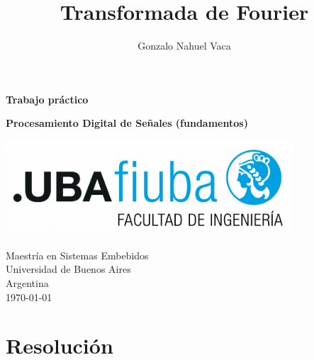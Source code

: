 \documentclass[
    11pt,
    spanish,
	a4paper
]{article}
\title{Transformada de Fourier}
\author{Gonzalo Nahuel Vaca}
\def\doctype{Trabajo práctico}
\begin{document}
\makeatletter
\begin{titlepage}
	\begin{center}
		\vspace*{1cm}
		
		\Huge
		\textbf{\doctype}
		\vspace{0.5cm}
    
		\LARGE
		\@title
		\vspace{0.5cm}
    
		\textbf{Procesamiento Digital de Señales (fundamentos)}
		
		\vspace{1.5cm}
		
		\textbf{\@author}

		\vspace{1.5cm}

		\includegraphics[width=0.8\textwidth]{img/logoFIUBA.pdf}
		
		\vfill
		Maestría en Sistemas Embebidos\\
		Universidad de Buenos Aires\\
		Argentina\\
		\today
	\end{center}
\end{titlepage}
\makeatother
\newpage

\section{Resolución}
\end{document}
